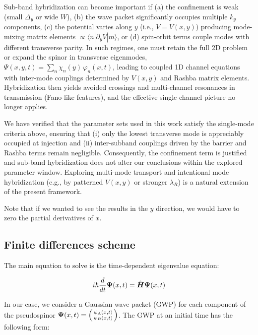 Sub-band hybridization can become important if (a) the confinement is weak (small $\Delta_y$ or wide $W$), (b) the wave packet significantly occupies multiple $k_y$ components, (c) the potential varies along $y$ (i.e., $V=V(x,y)$) producing mode-mixing matrix elements $\propto\langle n|\partial_y V|m\rangle$, or (d) spin-orbit terms couple modes with different transverse parity.
In such regimes, one must retain the full 2D problem or expand the spinor in transverse eigenmodes,
$\Psi(x,y,t)=\sum_n \chi_n(y)\, \varphi_n(x,t)$,
leading to coupled 1D channel equations with inter-mode couplings determined by $V(x,y)$ and Rashba matrix elements.
Hybridization then yields avoided crossings and multi-channel resonances in transmission (Fano-like features), and the effective single-channel picture no longer applies\cite{MiroshnichenkoRevModPhys2010}.

We have verified that the parameter sets used in this work satisfy the single-mode criteria above, ensuring that (i) only the lowest transverse mode is appreciably occupied at injection and (ii) inter-subband couplings driven by the barrier and Rashba terms remain negligible.
Consequently, the confinement term is justified and sub-band hybridization does not alter our conclusions within the explored parameter window.
Exploring multi-mode transport and intentional mode hybridization (e.g., by patterned $V(x,y)$ or stronger $\lambda_R$) is a natural extension of the present framework.

Note that if we wanted to see the results in the $y$ direction, we would have to zero the partial derivatives of $x$.

\subsection{Finite differences scheme}\label{subsec:finite-differences-scheme}

The main equation to solve is the time-dependent eigenvalue equation:

\begin{equation}
    \label{eq:schrodingerTimeDependent}
    i\hbar \frac{d}{dt}\mbox{\boldmath $\Psi$}(x,t) = \hat{\mbox{\boldmath $H$}}\mbox{\boldmath $\Psi$}(x,t)
\end{equation}

In our case, we consider a Gaussian wave packet (GWP) for each component of the pseudospinor $\bn{\Psi}(x,t)=\begin{psmallmatrix*}
\psi_A(x,t)\\\psi_B(x,t)
\end{psmallmatrix*}$.
The GWP at an initial time has the following form:

